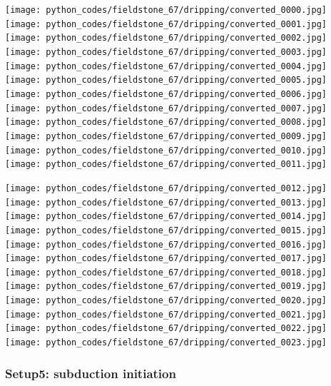 \begin{center}
\texttt{[image: python\_codes/fieldstone\_67/dripping/converted\_0000.jpg]}
\texttt{[image: python\_codes/fieldstone\_67/dripping/converted\_0001.jpg]}
\texttt{[image: python\_codes/fieldstone\_67/dripping/converted\_0002.jpg]}
\texttt{[image: python\_codes/fieldstone\_67/dripping/converted\_0003.jpg]}\\
\texttt{[image: python\_codes/fieldstone\_67/dripping/converted\_0004.jpg]}
\texttt{[image: python\_codes/fieldstone\_67/dripping/converted\_0005.jpg]}
\texttt{[image: python\_codes/fieldstone\_67/dripping/converted\_0006.jpg]}
\texttt{[image: python\_codes/fieldstone\_67/dripping/converted\_0007.jpg]}\\
\texttt{[image: python\_codes/fieldstone\_67/dripping/converted\_0008.jpg]}
\texttt{[image: python\_codes/fieldstone\_67/dripping/converted\_0009.jpg]}
\texttt{[image: python\_codes/fieldstone\_67/dripping/converted\_0010.jpg]}
\texttt{[image: python\_codes/fieldstone\_67/dripping/converted\_0011.jpg]}
\end{center}


\begin{center}
\texttt{[image: python\_codes/fieldstone\_67/dripping/converted\_0012.jpg]}
\texttt{[image: python\_codes/fieldstone\_67/dripping/converted\_0013.jpg]}
\texttt{[image: python\_codes/fieldstone\_67/dripping/converted\_0014.jpg]}
\texttt{[image: python\_codes/fieldstone\_67/dripping/converted\_0015.jpg]}\\
\texttt{[image: python\_codes/fieldstone\_67/dripping/converted\_0016.jpg]}
\texttt{[image: python\_codes/fieldstone\_67/dripping/converted\_0017.jpg]}
\texttt{[image: python\_codes/fieldstone\_67/dripping/converted\_0018.jpg]}
\texttt{[image: python\_codes/fieldstone\_67/dripping/converted\_0019.jpg]}\\
\texttt{[image: python\_codes/fieldstone\_67/dripping/converted\_0020.jpg]}
\texttt{[image: python\_codes/fieldstone\_67/dripping/converted\_0021.jpg]}
\texttt{[image: python\_codes/fieldstone\_67/dripping/converted\_0022.jpg]}
\texttt{[image: python\_codes/fieldstone\_67/dripping/converted\_0023.jpg]}
\end{center}



\newpage
\subsubsection*{Setup5: subduction initiation}

